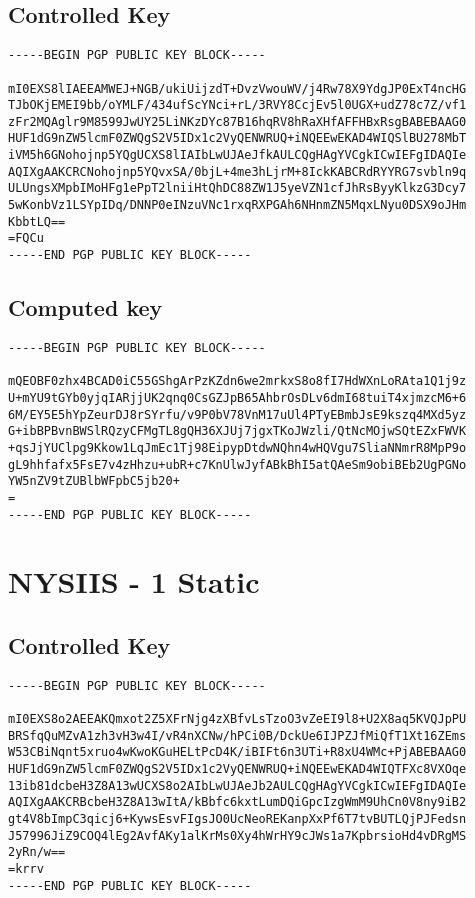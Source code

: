 \subsection{Controlled Key}
\begin{lstlisting}
-----BEGIN PGP PUBLIC KEY BLOCK-----

mI0EXS8lIAEEAMWEJ+NGB/ukiUijzdT+DvzVwouWV/j4Rw78X9YdgJP0ExT4ncHG
TJbOKjEMEI9bb/oYMLF/434ufScYNci+rL/3RVY8CcjEv5l0UGX+udZ78c7Z/vf1
zFr2MQAglr9M8599JwUY25LiNKzDYc87B16hqRV8hRaXHfAFFHBxRsgBABEBAAG0
HUF1dG9nZW5lcmF0ZWQgS2V5IDx1c2VyQENWRUQ+iNQEEwEKAD4WIQSlBU278MbT
iVM5h6GNohojnp5YQgUCXS8lIAIbLwUJAeJfkAULCQgHAgYVCgkICwIEFgIDAQIe
AQIXgAAKCRCNohojnp5YQvxSA/0bjL+4me3hLjrM+8IckKABCRdRYYRG7svbln9q
ULUngsXMpbIMoHFg1ePpT2lniiHtQhDC88ZW1J5yeVZN1cfJhRsByyKlkzG3Dcy7
5wKonbVz1LSYpIDq/DNNP0eINzuVNc1rxqRXPGAh6NHnmZN5MqxLNyu0DSX9oJHm
KbbtLQ==
=FQCu
-----END PGP PUBLIC KEY BLOCK-----
\end{lstlisting}

\subsection{Computed key}
\begin{lstlisting}
-----BEGIN PGP PUBLIC KEY BLOCK-----

mQEOBF0zhx4BCAD0iC55GShgArPzKZdn6we2mrkxS8o8fI7HdWXnLoRAta1Q1j9z
U+mYU9tGYb0yjqIARjjUK2qnq0CsGZJpB65AhbrOsDLv6dmI68tuiT4xjmzcM6+6
6M/EY5E5hYpZeurDJ8rSYrfu/v9P0bV78VnM17uUl4PTyEBmbJsE9kszq4MXd5yz
G+ibBPBvnBWSlRQzyCFMgTL8gQH36XJUj7jgxTKoJWzli/QtNcMOjwSQtEZxFWVK
+qsJjYUClpg9Kkow1LqJmEc1Tj98EipypDtdwNQhn4wHQVgu7SliaNNmrR8MpP9o
gL9hhfafx5FsE7v4zHhzu+ubR+c7KnUlwJyfABkBhI5atQAeSm9obiBEb2UgPGNo
YW5nZV9tZUBlbWFpbC5jb20+
=
-----END PGP PUBLIC KEY BLOCK-----
\end{lstlisting}

\newpage

\section{NYSIIS - 1 Static}
\label{appendix:nysiis_1_static}

\subsection{Controlled Key}
\begin{lstlisting}
-----BEGIN PGP PUBLIC KEY BLOCK-----

mI0EXS8o2AEEAKQmxot2Z5XFrNjg4zXBfvLsTzoO3vZeEI9l8+U2X8aq5KVQJpPU
BRSfqQuMZvA1zh3vH3w4I/vR4nXCNw/hPCi0B/DckUe6IJPZJfMiQfT1Xt16ZEms
W53CBiNqnt5xruo4wKwoKGuHELtPcD4K/iBIFt6n3UTi+R8xU4WMc+PjABEBAAG0
HUF1dG9nZW5lcmF0ZWQgS2V5IDx1c2VyQENWRUQ+iNQEEwEKAD4WIQTFXc8VXOqe
13ib81dcbeH3Z8A13wUCXS8o2AIbLwUJAeJb2AULCQgHAgYVCgkICwIEFgIDAQIe
AQIXgAAKCRBcbeH3Z8A13wItA/kBbfc6kxtLumDQiGpcIzgWmM9UhCn0V8ny9iB2
gt4V8bImpC3qicj6+KywsEsvFIgsJO0UcNeoREKanpXxPf6T7tvBUTLQjPJFedsn
J57996JiZ9COQ4lEg2AvfAKy1alKrMs0Xy4hWrHY9cJWs1a7KpbrsioHd4vDRgMS
2yRn/w==
=krrv
-----END PGP PUBLIC KEY BLOCK-----
\end{lstlisting}

